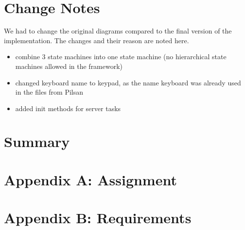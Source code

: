 \documentclass[a4paper,12pt,twoside]{scrreprt}
\begin{document}
\chapter{Change Notes}
\label{chap:ChangeNotes}
We had to change the original diagrams compared to the final version of the implementation. The changes and their reason are noted here. 

\begin{itemize}
	\item combine 3 state machines into one state machine (no hierarchical state machines allowed in the framework)
	\item changed keyboard name to keypad, as the name keyboard was already used in the files from Pilsan
	\item added init methods for server tasks
\end{itemize}
 
\chapter{Summary}
\label{chap:Summary}


%
%

\chapter*{Appendix A: Assignment}  %
\label{chap:AppendixAAssignment}



\chapter*{Appendix B: Requirements}  %
\label{chap:AppendixBRequirements}

\end{document}
